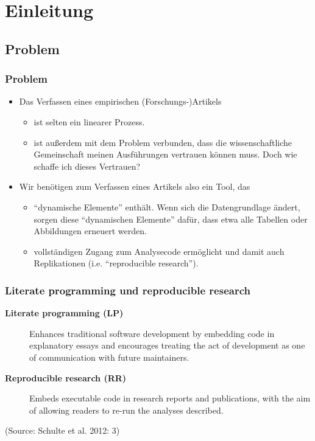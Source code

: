 \documentclass[bigger]{beamer}
\begin{document}
\section{Einleitung}
\label{sec-2}
\subsection{Problem}
\label{sec-2-1}
\begin{frame}
\frametitle{Problem}
\label{sec-2-1-1}


\begin{itemize}
\item Das Verfassen eines empirischen (Forschungs-)Artikels
\begin{itemize}
\item ist selten ein linearer Prozess.
\item ist außerdem mit dem Problem verbunden, dass die wissenschaftliche
    Gemeinschaft meinen Ausführungen vertrauen können muss. Doch wie schaffe ich
    dieses Vertrauen?
\end{itemize}
\item Wir benötigen zum Verfassen eines Artikels also ein Tool, das
\begin{itemize}
\item \enquote{dynamische Elemente} enthält. Wenn sich die Datengrundlage ändert, sorgen
    diese \enquote{dynamischen Elemente} dafür, dass etwa alle Tabellen oder Abbildungen
    erneuert werden.
\item vollständigen Zugang zum Analysecode ermöglicht und damit auch Replikationen (i.e. \enquote{reproducible research}).
\end{itemize}
\end{itemize}
\end{frame}
\begin{frame}
\frametitle{Literate programming und reproducible research}
\label{sec-2-1-2}


\begin{description}
\item[\textbf{Literate programming (LP)}] Enhances traditional software development by
     embedding code in explanatory essays and encourages treating the
     act of development as one of communication with future
     maintainers.
\item[\textbf{Reproducible research (RR)}] Embeds executable code in research reports
     and publications, with the aim of allowing readers to re-run the
     analyses described.
\end{description}

     
(Source: Schulte et al. 2012: 3)
\end{frame}
\end{document}
